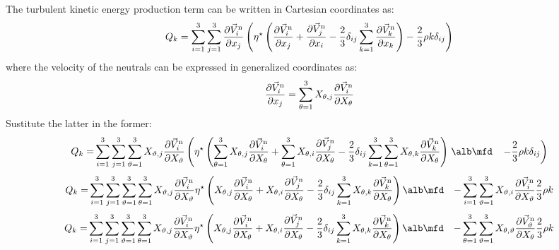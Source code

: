 
The turbulent kinetic energy production term can be written in Cartesian coordinates as:
%
%
\begin{equation}
Q_k=\sum_{i=1}^{3} \sum_{j=1}^{3} \frac{\partial \vec{V}^{\rm n}_i}{\partial x_j} \left( \eta^\star \left( \frac{\partial \vec{V}^{\rm n}_i}{\partial x_j}
   + \frac{\partial \vec{V}^{\rm n}_j}{\partial x_i} -\frac{2}{3} \delta_{ij} \sum_{k=1}^{3} \frac{\partial \vec{V}^{\rm n}_k}{\partial x_k}\right) -\frac{2}{3} \rho k \delta_{ij}\right)
\end{equation}
%
where the velocity of the neutrals can be expressed in generalized coordinates as:
%
\begin{equation}
\frac{\partial \vec{V}^{\rm n}_i}{\partial x_j}=\sum_{\theta=1}^{3} X_{\theta,j} \frac{\partial \vec{V}^{\rm n}_i}{\partial X_\theta}
\end{equation}
%
Sustitute the latter in the former:
%
\begin{align}
Q_k=&\sum_{i=1}^{3} \sum_{j=1}^{3} \sum_{\vartheta=1}^{3} X_{\vartheta,j} \frac{\partial \vec{V}^{\rm n}_i}{\partial X_\vartheta} \left( \eta^\star \left( \sum_{\theta=1}^{3} X_{\theta,j} \frac{\partial \vec{V}^{\rm n}_i}{\partial X_\theta}
   + \sum_{\theta=1}^{3} X_{\theta,i} \frac{\partial \vec{V}^{\rm n}_j}{\partial X_\theta} 
-\frac{2}{3} \delta_{ij} \sum_{k=1}^{3} \sum_{\theta=1}^{3} X_{\theta,k} \frac{\partial \vec{V}^{\rm n}_k}{\partial X_\theta}\right)
\right. \nonumber \alb\mfd
&\left.
 -\frac{2}{3} \rho k \delta_{ij}\right)
\end{align}
%
%
\begin{align}
Q_k=&\sum_{i=1}^{3} \sum_{j=1}^{3} \sum_{\vartheta=1}^{3} \sum_{\theta=1}^{3} X_{\vartheta,j} \frac{\partial \vec{V}^{\rm n}_i}{\partial X_\vartheta}
  \eta^\star
    \left(  X_{\theta,j} \frac{\partial \vec{V}^{\rm n}_i}{\partial X_\theta}
       + X_{\theta,i} \frac{\partial \vec{V}^{\rm n}_j}{\partial X_\theta} 
-\frac{2}{3} \delta_{ij} \sum_{k=1}^{3}  X_{\theta,k} \frac{\partial \vec{V}^{\rm n}_k}{\partial X_\theta}
    \right)
 \nonumber \alb\mfd
&
 -\sum_{i=1}^{3} \sum_{\vartheta=1}^{3} X_{\vartheta,i} \frac{\partial \vec{V}^{\rm n}_i}{\partial X_\vartheta} \frac{2}{3} \rho k
\end{align}
%
%
\begin{align}
Q_k=&\sum_{i=1}^{3} \sum_{j=1}^{3} \sum_{\vartheta=1}^{3} \sum_{\theta=1}^{3} X_{\vartheta,j} \frac{\partial \vec{V}^{\rm n}_i}{\partial X_\vartheta}
  \eta^\star
    \left(  X_{\theta,j} \frac{\partial \vec{V}^{\rm n}_i}{\partial X_\theta}
       + X_{\theta,i} \frac{\partial \vec{V}^{\rm n}_j}{\partial X_\theta} -\frac{2}{3} \delta_{ij} \sum_{k=1}^{3}  X_{\theta,k} \frac{\partial \vec{V}^{\rm n}_k}{\partial X_\theta}
    \right)\nonumber
\alb\mfd
 &-\sum_{\theta=1}^{3} \sum_{\vartheta=1}^{3} X_{\theta,\vartheta} \frac{\partial \vec{V}^{\rm n}_\vartheta}{\partial X_\theta} \frac{2}{3} \rho k
\end{align}
